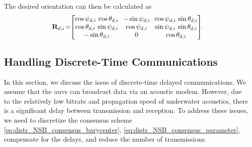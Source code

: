 The desired orientation can then be calculated as
\begin{equation}
    \mat{R}_{d, i\!} = \!\!\begin{bmatrix}
        \cos\psi_{d, i}\,\cos\theta_{d, i} & \!\!-\sin\psi_{d, i}\!\! & \cos\psi_{d, i}\,\sin\theta_{d, i}\\ \cos\theta_{d, i}\,\sin\psi_{d, i} & \!\!\cos\psi_{d, i}\!\! & \sin\psi_{d, i}\,\sin\theta_{d, i}\\ -\sin\theta_{d, i} & 0 & \cos\theta_{d, i}
    \end{bmatrix}\!\!\mathrlap{.}
\end{equation}


\subsection{Handling Discrete-Time Communications}
\label{sec:distr_NSB_event_triggered}
In this section, we discuss the issue of discrete-time delayed communications.
We assume that the \glspl{auv} can broadcast data via an acoustic modem.
However, due to the relatively low bitrate and propagation speed of underwater acoustics, there is a significant delay between transmission and reception.
To address these issues, we need to discretize the consensus scheme \eqref{eq:distr_NSB_consensus_barycenter}, \eqref{eq:distr_NSB_consensus_parameter}, compensate for the delays, and reduce the number of transmissions.

